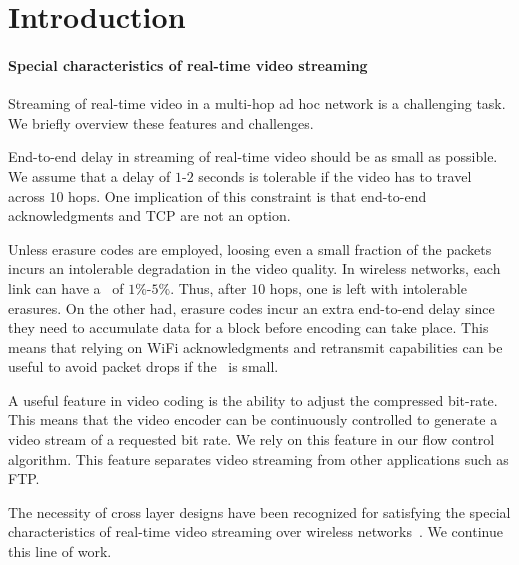 \documentclass[12pt]{article}
\newenvironment{proof sketch}[1]{\noindent {\emph{Proof sketch of #1:}}}{\hfill \qed}
\newcommand{\PER}{\text{\sc{per}}}
\begin{document}
\section{Introduction}

\paragraph{Special characteristics of real-time video streaming}
Streaming of real-time video in a multi-hop ad hoc network is a
challenging task.  We briefly overview these features and
challenges.
\begin{inparaenum}[(1)]
\item End-to-end delay in streaming of real-time video should be as
  small as possible.  We assume that a delay of $1$-$2$ seconds is
  tolerable if the video has to travel across $10$ hops.  One
  implication of this constraint is that end-to-end acknowledgments and TCP are
  not an option.
\item Unless erasure codes are employed, loosing even a small fraction
  of the packets incurs an intolerable degradation in the video
  quality. In wireless networks, each link can have a \PER\ of
  $1\%$-$5\%$. Thus, after $10$ hops, one is left with intolerable
  erasures.  On the other had, erasure codes incur an extra end-to-end
  delay since they need to accumulate data for a block before encoding
  can take place. This means that relying on WiFi acknowledgments and
  retransmit capabilities can be useful to avoid packet drops if the \PER\
  is small.
\item A useful feature in video coding is the ability to adjust the
  compressed bit-rate. This means that the video encoder can be
  continuously controlled to generate a video stream of a requested
  bit rate. We rely on this feature in our flow control algorithm.
  This feature separates video streaming from other applications such
  as FTP.
\item The necessity of cross layer designs have been recognized for
  satisfying the special characteristics of real-time video streaming
  over wireless
  networks~\cite{shan2005cross,setton2005cross,khan2006application}.
  We continue this line of work.
\end{inparaenum}
\end{document}
